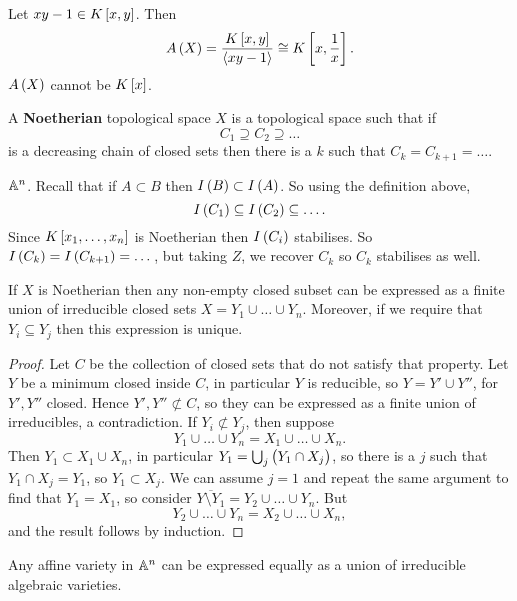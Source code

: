 \begin{example}
Let $ xy - 1 \in K\sbr{x, y} $. Then
$$ A\br{X} = \dfrac{K\sbr{x, y}}{\abr{xy - 1}} \cong K\sbr{x, \dfrac{1}{x}}. $$
$ A\br{X} $ cannot be $ K\sbr{x} $.
\end{example}

\begin{definition}
A \textbf{Noetherian} topological space $ X $ is a topological space such that if
$$ C_1 \supseteq C_2 \supseteq \dots $$
is a decreasing chain of closed sets then there is a $ k $ such that $ C_k = C_{k + 1} = \dots $.
\end{definition}

\begin{example}
$ \mathbb{A}^n $. Recall that if $ A \subset B $ then $ I\br{B} \subset I\br{A} $. So using the definition above,
$$ I\br{C_1} \subseteq I\br{C_2} \subseteq \dots. $$
Since $ K\sbr{x_1, \dots, x_n} $ is Noetherian then $ I\br{C_i} $ stabilises. So $ I\br{C_k} = I\br{C_{k + 1}} = \dots $, but taking $ Z $, we recover $ C_k $ so $ C_k $ stabilises as well.
\end{example}

\pagebreak

\begin{theorem}
If $ X $ is Noetherian then any non-empty closed subset can be expressed as a finite union of irreducible closed sets $ X = Y_1 \cup \dots \cup Y_n $. Moreover, if we require that $ Y_i \subseteq Y_j $ then this expression is unique.
\end{theorem}

\begin{proof}
Let $ C $ be the collection of closed sets that do not satisfy that property. Let $ Y $ be a minimum closed inside $ C $, in particular $ Y $ is reducible, so $ Y = Y' \cup Y'' $, for $ Y', Y'' $ closed. Hence $ Y', Y'' \not\subset C $, so they can be expressed as a finite union of irreducibles, a contradiction. If $ Y_i \not\subset Y_j $, then suppose
$$ Y_1 \cup \dots \cup Y_n = X_1 \cup \dots \cup X_n. $$
Then $ Y_1 \subset X_1 \cup X_n $, in particular $ Y_1 = \bigcup_j \br{Y_1 \cap X_j} $, so there is a $ j $ such that $ Y_1 \cap X_j = Y_1 $, so $ Y_1 \subset X_j $. We can assume $ j = 1 $ and repeat the same argument to find that $ Y_1 = X_1 $, so consider $ \overline{Y \setminus Y_1} = Y_2 \cup \dots \cup Y_n $. But
$$ Y_2 \cup \dots \cup Y_n = X_2 \cup \dots \cup X_n, $$
and the result follows by induction.
\end{proof}

\begin{corollary}
Any affine variety in $ \mathbb{A}^n $ can be expressed equally as a union of irreducible algebraic varieties.
\end{corollary}

